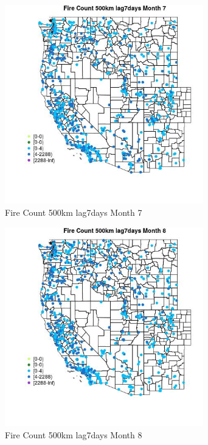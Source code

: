 \begin{figure} 
\centering  
\includegraphics[width=0.77\textwidth]{Code_Outputs/Report_ML_input_PM25_Step4_part_e_de_duplicated_aves_compiled_2019-05-21wNAs_MapObsMo7Fire_Count_500km_lag7days.jpg} 
\caption{\label{fig:Report_ML_input_PM25_Step4_part_e_de_duplicated_aves_compiled_2019-05-21wNAsMapObsMo7Fire_Count_500km_lag7days}Fire Count 500km lag7days Month 7} 
\end{figure} 
 

\begin{figure} 
\centering  
\includegraphics[width=0.77\textwidth]{Code_Outputs/Report_ML_input_PM25_Step4_part_e_de_duplicated_aves_compiled_2019-05-21wNAs_MapObsMo8Fire_Count_500km_lag7days.jpg} 
\caption{\label{fig:Report_ML_input_PM25_Step4_part_e_de_duplicated_aves_compiled_2019-05-21wNAsMapObsMo8Fire_Count_500km_lag7days}Fire Count 500km lag7days Month 8} 
\end{figure} 
 

